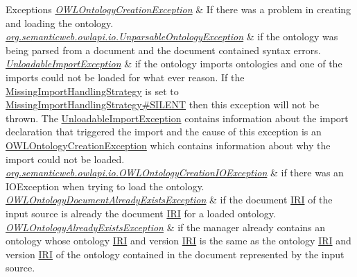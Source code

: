 \begin{DoxyExceptions}{Exceptions}
{\em \hyperlink{classorg_1_1semanticweb_1_1owlapi_1_1model_1_1_o_w_l_ontology_creation_exception}{O\-W\-L\-Ontology\-Creation\-Exception}} & If there was a problem in creating and loading the ontology. \\
\hline
{\em \hyperlink{classorg_1_1semanticweb_1_1owlapi_1_1io_1_1_unparsable_ontology_exception}{org.\-semanticweb.\-owlapi.\-io.\-Unparsable\-Ontology\-Exception}} & if the ontology was being parsed from a document and the document contained syntax errors. \\
\hline
{\em \hyperlink{classorg_1_1semanticweb_1_1owlapi_1_1model_1_1_unloadable_import_exception}{Unloadable\-Import\-Exception}} & if the ontology imports ontologies and one of the imports could not be loaded for what ever reason. If the \hyperlink{enumorg_1_1semanticweb_1_1owlapi_1_1model_1_1_missing_import_handling_strategy}{Missing\-Import\-Handling\-Strategy} is set to \hyperlink{enumorg_1_1semanticweb_1_1owlapi_1_1model_1_1_missing_import_handling_strategy_aed66060ec95dc4ad59ca4dd82509782b}{Missing\-Import\-Handling\-Strategy\#\-S\-I\-L\-E\-N\-T} then this exception will not be thrown. The {\ttfamily \hyperlink{classorg_1_1semanticweb_1_1owlapi_1_1model_1_1_unloadable_import_exception}{Unloadable\-Import\-Exception}} contains information about the import declaration that triggered the import and the cause of this exception is an {\ttfamily \hyperlink{classorg_1_1semanticweb_1_1owlapi_1_1model_1_1_o_w_l_ontology_creation_exception}{O\-W\-L\-Ontology\-Creation\-Exception}} which contains information about why the import could not be loaded. \\
\hline
{\em \hyperlink{classorg_1_1semanticweb_1_1owlapi_1_1io_1_1_o_w_l_ontology_creation_i_o_exception}{org.\-semanticweb.\-owlapi.\-io.\-O\-W\-L\-Ontology\-Creation\-I\-O\-Exception}} & if there was an {\ttfamily I\-O\-Exception} when trying to load the ontology. \\
\hline
{\em \hyperlink{classorg_1_1semanticweb_1_1owlapi_1_1model_1_1_o_w_l_ontology_document_already_exists_exception}{O\-W\-L\-Ontology\-Document\-Already\-Exists\-Exception}} & if the document \hyperlink{classorg_1_1semanticweb_1_1owlapi_1_1model_1_1_i_r_i}{I\-R\-I} of the input source is already the document \hyperlink{classorg_1_1semanticweb_1_1owlapi_1_1model_1_1_i_r_i}{I\-R\-I} for a loaded ontology. \\
\hline
{\em \hyperlink{classorg_1_1semanticweb_1_1owlapi_1_1model_1_1_o_w_l_ontology_already_exists_exception}{O\-W\-L\-Ontology\-Already\-Exists\-Exception}} & if the manager already contains an ontology whose ontology \hyperlink{classorg_1_1semanticweb_1_1owlapi_1_1model_1_1_i_r_i}{I\-R\-I} and version \hyperlink{classorg_1_1semanticweb_1_1owlapi_1_1model_1_1_i_r_i}{I\-R\-I} is the same as the ontology \hyperlink{classorg_1_1semanticweb_1_1owlapi_1_1model_1_1_i_r_i}{I\-R\-I} and version \hyperlink{classorg_1_1semanticweb_1_1owlapi_1_1model_1_1_i_r_i}{I\-R\-I} of the ontology contained in the document represented by the input source. \\
\hline
\end{DoxyExceptions}



